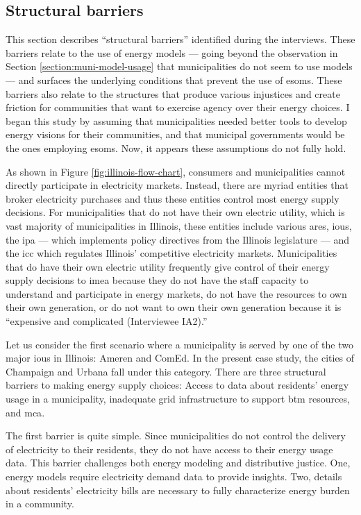 \subsection{Structural barriers}
\label{section:structural-barriers}

This section describes ``structural barriers'' identified during the interviews.
These barriers relate to the use of energy models --- going beyond the
observation in Section \ref{section:muni-model-usage} that municipalities do not
seem to use models --- and surfaces the underlying conditions that prevent the
use of \acp{esom}. These barriers also relate to the structures that produce
various injustices and create friction for communities that want to exercise
agency over their energy choices. I began this study by assuming that
municipalities needed better tools to develop energy visions for their
communities, and that municipal governments would be the ones employing
\acp{esom}. Now, it appears these assumptions do not fully hold.

As shown in Figure \ref{fig:illinois-flow-chart}, consumers and municipalities
cannot directly participate in electricity markets. Instead, there are myriad
entities that broker electricity purchases and thus these entities control most
energy supply decisions. For municipalities that do not have their own electric
utility, which is vast majority of municipalities in Illinois, these entities
include various \ac{ares}, \acp{iou}, the \ac{ipa} --- which implements policy
directives from the Illinois legislature --- and the \ac{icc} which regulates
Illinois' competitive electricity markets. Municipalities that do have their own
electric utility frequently give control of their energy supply decisions to
\ac{imea} because they do not have the staff capacity to understand and
participate in energy markets, do not have the resources to own their own
generation, or do not want to own their own generation because it is ``expensive
and complicated (Interviewee IA2).''

Let us consider the first scenario where a municipality is served by one of the
two major \acp{iou} in Illinois: Ameren and ComEd. In the present case study,
the cities of Champaign and Urbana fall under this category. There are three
structural barriers to making energy supply choices: Access to data about
residents' energy usage in a municipality, inadequate grid infrastructure to
support \ac{btm} resources, and \acf{mca}.

The first barrier is quite simple. Since municipalities do not control the
delivery of electricity to their residents, they do not have access to their
energy usage data. This barrier challenges both energy modeling and distributive
justice. One, energy models require electricity demand data to provide insights. Two, details
about residents' electricity bills are necessary to fully characterize energy burden in a
community.

